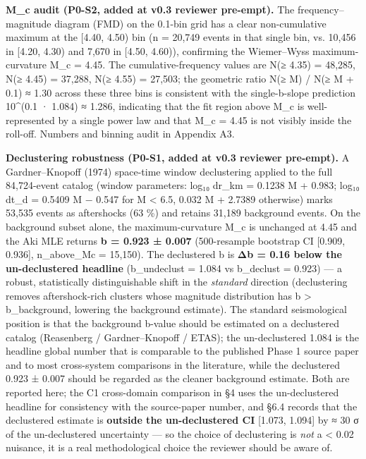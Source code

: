 \documentclass[
  11pt]{article}
\begin{document}
\textbf{M\_c audit (P0-S2, added at v0.3 reviewer pre-empt).} The
frequency--magnitude diagram (FMD) on the 0.1-bin grid has a clear
non-cumulative maximum at the {[}4.40, 4.50) bin (n = 20,749 events in
that single bin, vs. 10,456 in {[}4.20, 4.30) and 7,670 in {[}4.50,
4.60)), confirming the Wiemer--Wyss maximum-curvature M\_c = 4.45. The
cumulative-frequency values are N(≥ 4.35) = 48,285, N(≥ 4.45) = 37,288,
N(≥ 4.55) = 27,503; the geometric ratio N(≥ M) / N(≥ M + 0.1) ≈ 1.30
across these three bins is consistent with the single-b-slope prediction
10\^{}(0.1 · 1.084) ≈ 1.286, indicating that the fit region above M\_c
is well-represented by a single power law and that M\_c = 4.45 is not
visibly inside the roll-off. Numbers and binning audit in Appendix A3.

\textbf{Declustering robustness (P0-S1, added at v0.3 reviewer
pre-empt).} A Gardner--Knopoff (1974) space-time window declustering
applied to the full 84,724-event catalog (window parameters: log₁₀
dr\_km = 0.1238 M + 0.983; log₁₀ dt\_d = 0.5409 M − 0.547 for M
\textless{} 6.5, 0.032 M + 2.7389 otherwise) marks 53,535 events as
aftershocks (63 \%) and retains 31,189 background events. On the
background subset alone, the maximum-curvature M\_c is unchanged at 4.45
and the Aki MLE returns \textbf{b = 0.923 ± 0.007} (500-resample
bootstrap CI {[}0.909, 0.936{]}, n\_above\_Mc = 15,150). The declustered
b is \textbf{Δb = 0.16 below the un-declustered headline} (b\_undeclust
= 1.084 vs b\_declust = 0.923) --- a robust, statistically
distinguishable shift in the \emph{standard} direction (declustering
removes aftershock-rich clusters whose magnitude distribution has b
\textgreater{} b\_background, lowering the background estimate). The
standard seismological position is that the background b-value should be
estimated on a declustered catalog (Reasenberg / Gardner--Knopoff /
ETAS); the un-declustered 1.084 is the headline global number that is
comparable to the published Phase 1 source paper and to most
cross-system comparisons in the literature, while the declustered 0.923
± 0.007 should be regarded as the cleaner background estimate. Both are
reported here; the C1 cross-domain comparison in §4 uses the
un-declustered headline for consistency with the source-paper number,
and §6.4 records that the declustered estimate is \textbf{outside the
un-declustered CI} {[}1.073, 1.094{]} by ≈ 30 σ of the un-declustered
uncertainty --- so the choice of declustering is \emph{not} a
\textless{} 0.02 nuisance, it is a real methodological choice the
reviewer should be aware of.
\end{document}
